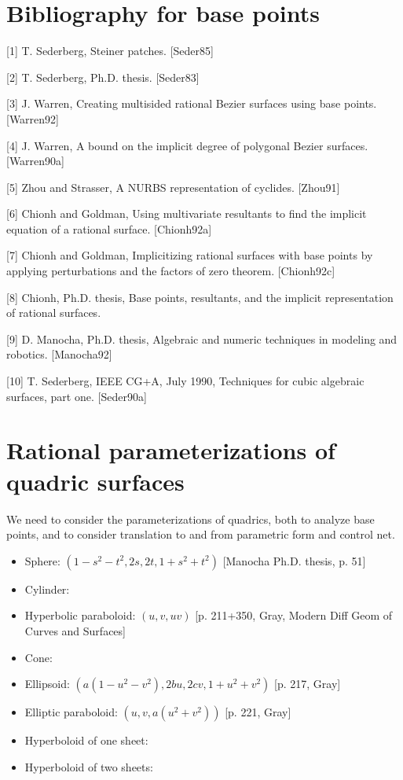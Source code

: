 \section{Bibliography for base points}

[1] T. Sederberg, Steiner patches. [Seder85]

[2] T. Sederberg, Ph.D. thesis. [Seder83]

[3] J. Warren, Creating multisided rational
	Bezier surfaces using base points. [Warren92]

[4] J. Warren, A bound on the implicit degree
	of polygonal Bezier surfaces.  [Warren90a]

[5] Zhou and Strasser, A NURBS representation of 
	cyclides.	[Zhou91]

[6] Chionh and Goldman, Using multivariate resultants
	to find the implicit equation of a rational
	surface. [Chionh92a]

[7] Chionh and Goldman, Implicitizing rational
	surfaces with base points by applying
	perturbations and the factors of zero theorem. [Chionh92c]

[8] Chionh, Ph.D. thesis, Base points, resultants,
	and the implicit representation of rational
	surfaces.	

[9] D. Manocha, Ph.D. thesis, Algebraic and numeric
	techniques in modeling and robotics.  [Manocha92]

[10] T. Sederberg, IEEE CG+A, July 1990,
	Techniques for cubic algebraic surfaces, part one. [Seder90a]

\section{Rational parameterizations of quadric surfaces}

We need to consider the parameterizations of quadrics,
both to analyze base points, and to consider translation
to and from parametric form and control net.

\begin{itemize}
\item
Sphere:	$(1-s^2-t^2,2s,2t,1+s^2+t^2)$
	[Manocha Ph.D. thesis, p. 51]
\item
Cylinder:
\item
Hyperbolic paraboloid: $(u,v,uv)$ 	[p. 211+350, Gray, 
			 Modern Diff Geom of Curves and Surfaces]
\item
Cone:
\item
Ellipsoid: $(a(1-u^2-v^2),2bu,2cv,1+u^2+v^2)$  [p. 217, Gray]
\item
Elliptic paraboloid: $(u,v,a(u^2+v^2))$	  [p. 221, Gray]
\item
Hyperboloid of one sheet:
\item
Hyperboloid of two sheets:
\end{itemize}





